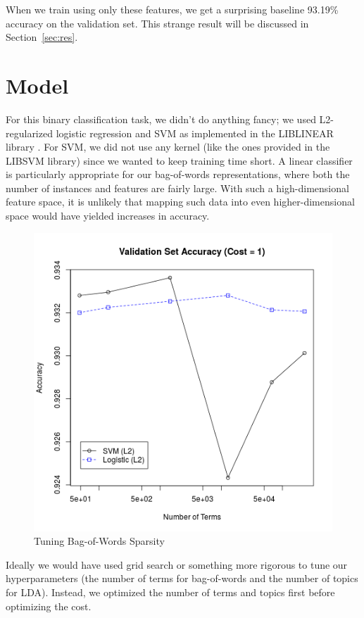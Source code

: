 \documentclass{sig-alternate-05-2015}
\begin{document}
When we train using only these features, we get a surprising baseline 93.19\% accuracy on the validation set. This strange result will be discussed in Section~\ref{sec:res}. 

\section{Model}
For this binary classification task, we didn't do anything fancy; we used L2-regularized logistic regression and SVM as implemented in the \textsf{LIBLINEAR} library \cite{Fan2008}. For SVM, we did not use any kernel (like the ones provided in the \textsf{LIBSVM} library) since we wanted to keep training time short. A linear classifier is particularly appropriate for our bag-of-words representations, where both the number of instances and features are fairly large. With such a high-dimensional feature space, it is unlikely that mapping such data into even higher-dimensional space would have yielded increases in accuracy.

\begin{figure}
  \centering
  \includegraphics[scale=0.5]{valid_numTerms.png}
  \caption{Tuning Bag-of-Words Sparsity}
  \label{fig:sparse}
\end{figure}

Ideally we would have used grid search or something more rigorous to tune our hyperparameters (the number of terms for bag-of-words and the number of topics for LDA). Instead, we optimized the number of terms and topics first before optimizing the cost.
\end{document}
